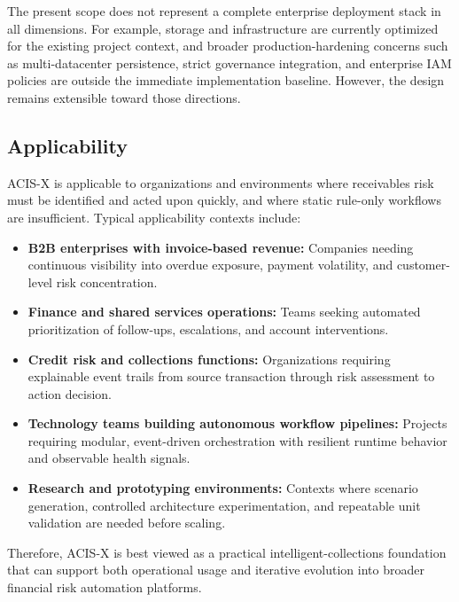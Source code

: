 \documentclass[a4paper, 12pt]{report}
\begin{document}
The present scope does not represent a complete enterprise deployment stack in all dimensions. For example, storage and infrastructure are currently optimized for the existing project context, and broader production-hardening concerns such as multi-datacenter persistence, strict governance integration, and enterprise IAM policies are outside the immediate implementation baseline. However, the design remains extensible toward those directions.

\subsection{Applicability}
ACIS-X is applicable to organizations and environments where receivables risk must be identified and acted upon quickly, and where static rule-only workflows are insufficient. Typical applicability contexts include:

\begin{itemize}[itemsep=2pt]
    \item \textbf{B2B enterprises with invoice-based revenue:}
    Companies needing continuous visibility into overdue exposure, payment volatility, and customer-level risk concentration.
    
    \item \textbf{Finance and shared services operations:}
    Teams seeking automated prioritization of follow-ups, escalations, and account interventions.
    
    \item \textbf{Credit risk and collections functions:}
    Organizations requiring explainable event trails from source transaction through risk assessment to action decision.
    
    \item \textbf{Technology teams building autonomous workflow pipelines:}
    Projects requiring modular, event-driven orchestration with resilient runtime behavior and observable health signals.
    
    \item \textbf{Research and prototyping environments:}
    Contexts where scenario generation, controlled architecture experimentation, and repeatable unit validation are needed before scaling.
\end{itemize}

Therefore, ACIS-X is best viewed as a practical intelligent-collections foundation that can support both operational usage and iterative evolution into broader financial risk automation platforms.
\end{document}
